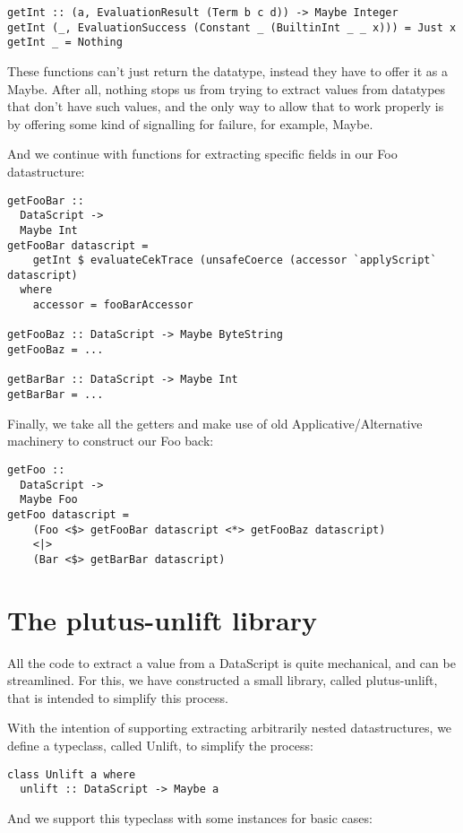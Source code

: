 \documentclass{article}
\begin{document}
\begin{verbatim}
getInt :: (a, EvaluationResult (Term b c d)) -> Maybe Integer
getInt (_, EvaluationSuccess (Constant _ (BuiltinInt _ _ x))) = Just x
getInt _ = Nothing
\end{verbatim}

These functions can't just return the datatype, instead they have to offer it as a Maybe. After all, nothing stops us from trying to extract values from datatypes that don't have such values, and the only way to allow that to work properly is by offering some kind of signalling for failure, for example, Maybe.

And we continue with functions for extracting specific fields in our Foo datastructure:
\begin{verbatim}
getFooBar ::
  DataScript ->
  Maybe Int
getFooBar datascript =
    getInt $ evaluateCekTrace (unsafeCoerce (accessor `applyScript` datascript)
  where
    accessor = fooBarAccessor

getFooBaz :: DataScript -> Maybe ByteString
getFooBaz = ...

getBarBar :: DataScript -> Maybe Int
getBarBar = ...
\end{verbatim}

Finally, we take all the getters and make use of old Applicative/Alternative machinery to construct our Foo back:

\begin{verbatim}
getFoo ::
  DataScript ->
  Maybe Foo
getFoo datascript =
    (Foo <$> getFooBar datascript <*> getFooBaz datascript)
    <|>
    (Bar <$> getBarBar datascript)
\end{verbatim}

\section{The plutus-unlift library}
All the code to extract a value from a DataScript is quite mechanical, and can be streamlined. For this, we have constructed a small library, called plutus-unlift, that is intended to simplify this process.

With the intention of supporting extracting arbitrarily nested datastructures, we define a typeclass, called Unlift, to simplify the process:

\begin{verbatim}
class Unlift a where
  unlift :: DataScript -> Maybe a
\end{verbatim}

And we support this typeclass with some instances for basic cases:
\end{document}
